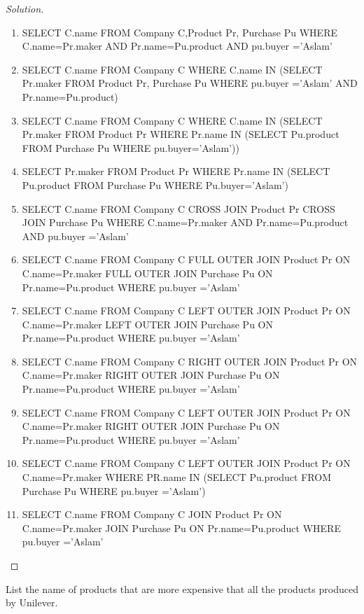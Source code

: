 \documentclass[10pt,a4paper]{article}
\newenvironment{problem}[2][Problem]{\begin{trivlist}
\item[\hskip \labelsep {\bfseries #1}\hskip \labelsep {\bfseries #2.}]}{\end{trivlist}}
\begin{document}
\begin{proof}[Solution]
\begin{enumerate}
	\item SELECT C.name FROM Company C,Product Pr, Purchase Pu WHERE  C.name=Pr.maker AND Pr.name=Pu.product AND pu.buyer ='Aslam'
	\item SELECT C.name FROM Company C WHERE C.name IN (SELECT Pr.maker FROM Product Pr, Purchase Pu WHERE pu.buyer ='Aslam' AND Pr.name=Pu.product)
	\item SELECT C.name FROM Company C WHERE C.name IN (SELECT Pr.maker
FROM Product Pr WHERE Pr.name IN (SELECT Pu.product FROM Purchase Pu WHERE pu.buyer='Aslam'))
	\item SELECT Pr.maker FROM Product Pr WHERE Pr.name IN (SELECT Pu.product FROM Purchase Pu WHERE Pu.buyer='Aslam')
	\item SELECT C.name FROM Company C CROSS JOIN Product Pr CROSS JOIN Purchase Pu WHERE C.name=Pr.maker AND Pr.name=Pu.product AND pu.buyer ='Aslam'
	\item SELECT C.name FROM Company C FULL OUTER JOIN Product Pr ON C.name=Pr.maker FULL OUTER JOIN Purchase Pu ON Pr.name=Pu.product WHERE pu.buyer ='Aslam'
	\item SELECT C.name FROM Company C LEFT OUTER JOIN Product Pr 
ON C.name=Pr.maker LEFT OUTER JOIN Purchase Pu ON Pr.name=Pu.product WHERE pu.buyer ='Aslam'
	\item SELECT C.name FROM Company C RIGHT OUTER JOIN Product Pr ON C.name=Pr.maker RIGHT OUTER JOIN Purchase Pu ON Pr.name=Pu.product WHERE pu.buyer ='Aslam' 
	\item SELECT C.name FROM Company C LEFT OUTER JOIN Product Pr ON C.name=Pr.maker RIGHT OUTER JOIN Purchase Pu ON Pr.name=Pu.product WHERE pu.buyer ='Aslam'
	\item SELECT C.name FROM Company C LEFT OUTER JOIN Product Pr ON C.name=Pr.maker WHERE PR.name IN (SELECT Pu.product FROM Purchase Pu WHERE pu.buyer ='Aslam')
	\item SELECT C.name FROM Company C JOIN Product Pr ON C.name=Pr.maker JOIN Purchase Pu ON Pr.name=Pu.product WHERE pu.buyer ='Aslam' 
\end{enumerate}
\end{proof}

\begin{problem}{3}
List the name of products that are more expensive that all the products produced by Unilever.
\end{problem}
\end{document}
